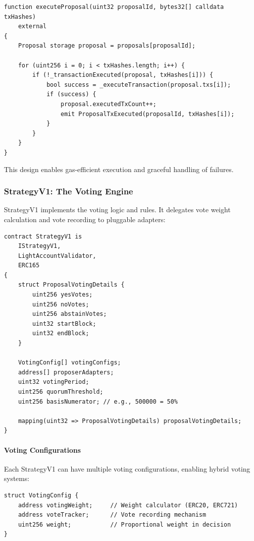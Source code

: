 \begin{lstlisting}[caption=Partial Execution Logic]
function executeProposal(uint32 proposalId, bytes32[] calldata txHashes)
    external
{
    Proposal storage proposal = proposals[proposalId];

    for (uint256 i = 0; i < txHashes.length; i++) {
        if (!_transactionExecuted(proposal, txHashes[i])) {
            bool success = _executeTransaction(proposal.txs[i]);
            if (success) {
                proposal.executedTxCount++;
                emit ProposalTxExecuted(proposalId, txHashes[i]);
            }
        }
    }
}
\end{lstlisting}

This design enables gas-efficient execution and graceful handling of failures.

\subsubsection{StrategyV1: The Voting Engine}

StrategyV1 implements the voting logic and rules. It delegates vote weight calculation and vote recording to pluggable adapters:

\begin{lstlisting}[caption=StrategyV1 Architecture]
contract StrategyV1 is
    IStrategyV1,
    LightAccountValidator,
    ERC165
{
    struct ProposalVotingDetails {
        uint256 yesVotes;
        uint256 noVotes;
        uint256 abstainVotes;
        uint32 startBlock;
        uint32 endBlock;
    }

    VotingConfig[] votingConfigs;
    address[] proposerAdapters;
    uint32 votingPeriod;
    uint256 quorumThreshold;
    uint256 basisNumerator; // e.g., 500000 = 50%

    mapping(uint32 => ProposalVotingDetails) proposalVotingDetails;
}
\end{lstlisting}

\paragraph{Voting Configurations}

Each StrategyV1 can have multiple voting configurations, enabling hybrid voting systems:

\begin{lstlisting}[caption=Voting Configuration Structure]
struct VotingConfig {
    address votingWeight;     // Weight calculator (ERC20, ERC721)
    address voteTracker;      // Vote recording mechanism
    uint256 weight;           // Proportional weight in decision
}
\end{lstlisting}

